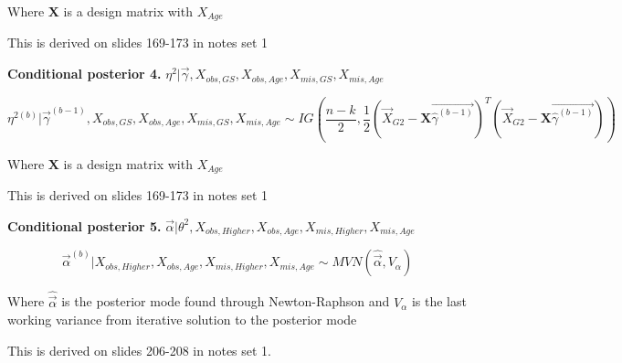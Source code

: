 \documentclass[11pt]{article}
\begin{document}
Where $\mathbf{X}$ is a design matrix with $X_{Age}$

This is derived on slides 169-173 in notes set 1

\vspace{0.25in}

\textbf{Conditional posterior 4.} $\eta^2|\vec{\gamma}, X_{obs, GS}, X_{obs, Age}, X_{mis, GS}, X_{mis, Age}$

$$\eta^{2(b)}|\vec{\gamma}^{(b - 1)}, X_{obs, GS}, X_{obs, Age}, X_{mis, GS}, X_{mis, Age} \sim IG\left(\frac{n - k}{2}, \frac{1}{2}(\vec{X}_{G2} - \mathbf{X}\vec{\hat\gamma^{(b - 1)}})^T(\vec{X}_{G2} - \mathbf{X}\vec{\hat\gamma^{(b - 1)}})\right)$$

Where $\mathbf{X}$ is a design matrix with $X_{Age}$

This is derived on slides 169-173 in notes set 1

\vspace{0.25in}

\textbf{Conditional posterior 5.} $\vec\alpha| \theta^2, X_{obs, Higher}, X_{obs, Age}, X_{mis, Higher}, X_{mis, Age}$

$$\vec\alpha^{(b)}|  X_{obs, Higher}, X_{obs, Age}, X_{mis, Higher}, X_{mis, Age} \sim MVN(\hat{\vec\alpha}, V_{\alpha})$$

Where $\hat{\vec\alpha}$ is the posterior mode found through Newton-Raphson and $V_{\alpha}$ is the last working variance from iterative solution to the posterior mode

This is derived on slides 206-208 in notes set 1.

\newpage



\end{document}
